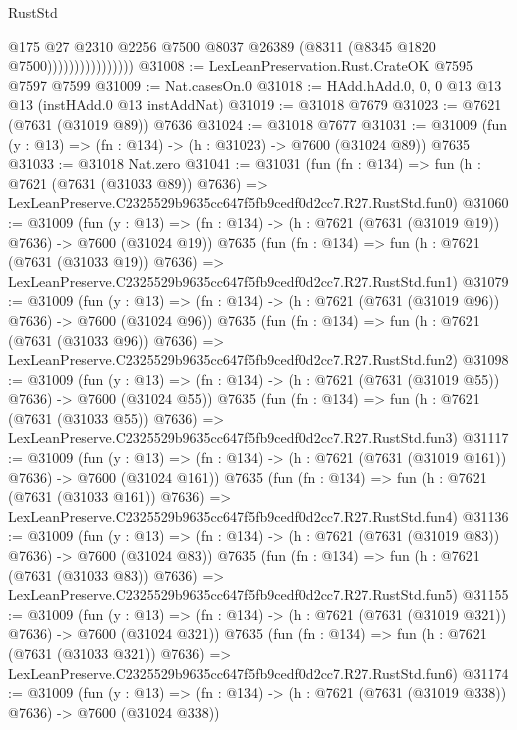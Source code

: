 \begin{lexlean}{RustStd}
\begin{coremodule}
                                @175
                                @27
                                @2310
                                @2256
                                @7500
                                @8037
                                @26389
                                (@8311 (@8345 @1820 @7500))))))))))))))))
@31008 := LexLeanPreservation.Rust.CrateOK @7595 @7597 @7599
@31009 := Nat.casesOn.{0}
@31018 := HAdd.hAdd.{0, 0, 0} @13 @13 @13 (instHAdd.{0} @13 instAddNat)
@31019 := @31018 @7679
@31023 := @7621 (@7631 (@31019 @89)) @7636
@31024 := @31018 @7677
@31031 := @31009 (fun (y : @13) => (fn : @134) -> (h : @31023) -> @7600 (@31024 @89)) @7635
@31033 := @31018 Nat.zero
@31041 := @31031
    (fun (fn : @134) =>
    fun (h : @7621 (@7631 (@31033 @89)) @7636) =>
    LexLeanPreserve.C2325529b9635cc647f5fb9cedf0d2cc7.R27.RustStd.fun0)
@31060 := @31009
    (fun (y : @13) => (fn : @134) -> (h : @7621 (@7631 (@31019 @19)) @7636) -> @7600 (@31024 @19))
    @7635
    (fun (fn : @134) =>
    fun (h : @7621 (@7631 (@31033 @19)) @7636) =>
    LexLeanPreserve.C2325529b9635cc647f5fb9cedf0d2cc7.R27.RustStd.fun1)
@31079 := @31009
    (fun (y : @13) => (fn : @134) -> (h : @7621 (@7631 (@31019 @96)) @7636) -> @7600 (@31024 @96))
    @7635
    (fun (fn : @134) =>
    fun (h : @7621 (@7631 (@31033 @96)) @7636) =>
    LexLeanPreserve.C2325529b9635cc647f5fb9cedf0d2cc7.R27.RustStd.fun2)
@31098 := @31009
    (fun (y : @13) => (fn : @134) -> (h : @7621 (@7631 (@31019 @55)) @7636) -> @7600 (@31024 @55))
    @7635
    (fun (fn : @134) =>
    fun (h : @7621 (@7631 (@31033 @55)) @7636) =>
    LexLeanPreserve.C2325529b9635cc647f5fb9cedf0d2cc7.R27.RustStd.fun3)
@31117 := @31009
    (fun (y : @13) => (fn : @134) -> (h : @7621 (@7631 (@31019 @161)) @7636) -> @7600 (@31024 @161))
    @7635
    (fun (fn : @134) =>
    fun (h : @7621 (@7631 (@31033 @161)) @7636) =>
    LexLeanPreserve.C2325529b9635cc647f5fb9cedf0d2cc7.R27.RustStd.fun4)
@31136 := @31009
    (fun (y : @13) => (fn : @134) -> (h : @7621 (@7631 (@31019 @83)) @7636) -> @7600 (@31024 @83))
    @7635
    (fun (fn : @134) =>
    fun (h : @7621 (@7631 (@31033 @83)) @7636) =>
    LexLeanPreserve.C2325529b9635cc647f5fb9cedf0d2cc7.R27.RustStd.fun5)
@31155 := @31009
    (fun (y : @13) => (fn : @134) -> (h : @7621 (@7631 (@31019 @321)) @7636) -> @7600 (@31024 @321))
    @7635
    (fun (fn : @134) =>
    fun (h : @7621 (@7631 (@31033 @321)) @7636) =>
    LexLeanPreserve.C2325529b9635cc647f5fb9cedf0d2cc7.R27.RustStd.fun6)
@31174 := @31009
    (fun (y : @13) => (fn : @134) -> (h : @7621 (@7631 (@31019 @338)) @7636) -> @7600 (@31024 @338))

\end{coremodule}
\end{lexlean}
